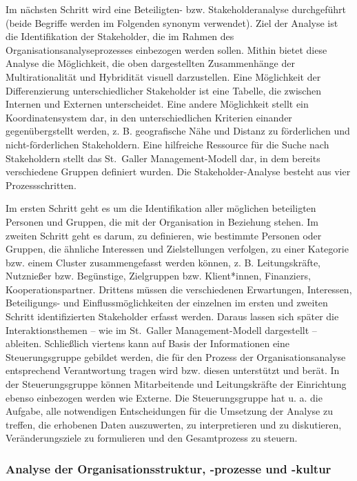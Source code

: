 \documentclass[
  letterpaper,
]{book}
\begin{document}
Im nächsten Schritt wird eine Beteiligten- bzw. Stakeholderanalyse
durchgeführt (beide Begriffe werden im Folgenden synonym verwendet).
Ziel der Analyse ist die Identifikation der Stakeholder, die im Rahmen
des Organisationsanalyseprozesses einbezogen werden sollen. Mithin
bietet diese Analyse die Möglichkeit, die oben dargestellten
Zusammenhänge der Multirationalität und Hybridität visuell darzustellen.
Eine Möglichkeit der Differenzierung unterschiedlicher Stakeholder ist
eine Tabelle, die zwischen Internen und Externen unterscheidet. Eine
andere Möglichkeit stellt ein Koordinatensystem dar, in den
unterschiedlichen Kriterien einander gegenübergstellt werden, z. B.
geografische Nähe und Distanz zu förderlichen und nicht-förderlichen
Stakeholdern. Eine hilfreiche Ressource für die Suche nach Stakeholdern
stellt das St.~Galler Management-Modell dar, in dem bereits verschiedene
Gruppen definiert wurden. Die Stakeholder-Analyse besteht aus vier
Prozessschritten.

Im ersten Schritt geht es um die Identifikation aller möglichen
beteiligten Personen und Gruppen, die mit der Organisation in Beziehung
stehen. Im zweiten Schritt geht es darum, zu definieren, wie bestimmte
Personen oder Gruppen, die ähnliche Interessen und Zielstellungen
verfolgen, zu einer Kategorie bzw. einem Cluster zusammengefasst werden
können, z. B. Leitungskräfte, Nutznießer bzw. Begünstige, Zielgruppen
bzw. Klient*innen, Finanziers, Kooperationspartner. Drittens müssen die
verschiedenen Erwartungen, Interessen, Beteiligungs- und
Einflussmöglichkeiten der einzelnen im ersten und zweiten Schritt
identifizierten Stakeholder erfasst werden. Daraus lassen sich später
die Interaktionsthemen -- wie im St.~Galler Management-Modell
dargestellt -- ableiten. Schließlich viertens kann auf Basis der
Informationen eine Steuerungsgruppe gebildet werden, die für den Prozess
der Organisationsanalyse entsprechend Verantwortung tragen wird bzw.
diesen unterstützt und berät. In der Steuerungsgruppe können
Mitarbeitende und Leitungskräfte der Einrichtung ebenso einbezogen
werden wie Externe. Die Steuerungsgruppe hat u. a. die Aufgabe, alle
notwendigen Entscheidungen für die Umsetzung der Analyse zu treffen, die
erhobenen Daten auszuwerten, zu interpretieren und zu diskutieren,
Veränderungsziele zu formulieren und den Gesamtprozess zu steuern.

\subsubsection{Analyse der Organisationsstruktur, -prozesse und
-kultur}\label{analyse-der-organisationsstruktur--prozesse-und--kultur}
\end{document}
